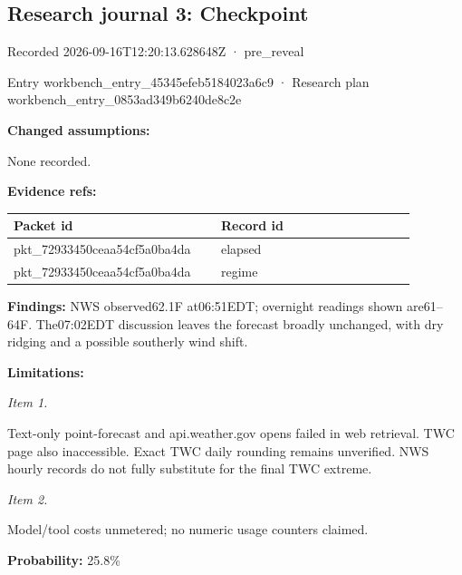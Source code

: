\documentclass[11pt]{article}
\begin{document}
\subsection*{\textcolor{epdarkgreen}{Research journal 3: Checkpoint}}
Recorded 2026-09-16T12:20:13.628648Z · pre\_reveal


Entry workbench\_en\hspace{0pt}try\_45345efe\hspace{0pt}b5184023a6c9 · Research plan workbench\_en\hspace{0pt}try\_0853ad34\hspace{0pt}9b6240de8c2e


\par\noindent\textbf{Changed assumptions:} \par None recorded.

\par\noindent\textbf{Evidence refs:} \par \begin{longtable}{>{\raggedright\arraybackslash}p{0.440\linewidth}>{\raggedright\arraybackslash}p{0.440\linewidth}}
Packet id & Record id \\ \hline\endhead
pkt\_72933450ceaa54cf5a0ba4da & elapsed \\
pkt\_72933450ceaa54cf5a0ba4da & regime \\
\end{longtable}

\par\noindent\textbf{Findings:} NWS observed62.1F at06:51EDT; overnight readings shown are61–64F. The07:02EDT discussion leaves the forecast broadly unchanged, with dry ridging and a possible southerly wind shift.

\par\noindent\textbf{Limitations:} \par \par\noindent\textit{Item 1.}\par Text-only point-forecast and api.weather.gov opens failed in web retrieval. TWC page also inaccessible. Exact TWC daily rounding remains unverified. NWS hourly records do not fully substitute for the final TWC extreme.

\par\noindent\textit{Item 2.}\par Model/tool costs unmetered; no numeric usage counters claimed.

\par\noindent\textbf{Probability:} 25.8\%
\end{document}
